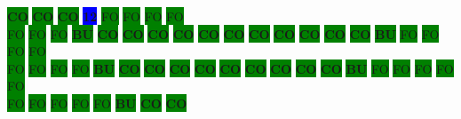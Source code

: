 \colorbox{green}{\color[rgb]{0,0,0}\textbf{CO}}%
\colorbox{green}{\color[rgb]{0,0,0}\textbf{CO}}%
\colorbox{green}{\color[rgb]{0,0,0}\textbf{CO}}%
\colorbox{blue}{\color[rgb]{1,0,0}\textbf{12}}%
\colorbox{green}{\color[gray]{0.75}FO}%
\colorbox{green}{\color[gray]{0.75}FO}%
\colorbox{green}{\color[gray]{0.75}FO}%
\colorbox{green}{\color[gray]{0.75}FO}%
\\
\colorbox{green}{\color[gray]{0.75}FO}%
\colorbox{green}{\color[gray]{0.75}FO}%
\colorbox{green}{\color[gray]{0.75}FO}%
\colorbox{green}{\color[rgb]{1,0,0}\textbf{BU}}%
\colorbox{green}{\color[rgb]{0,0,0}\textbf{CO}}%
\colorbox{green}{\color[rgb]{0,0,0}\textbf{CO}}%
\colorbox{green}{\color[rgb]{0,0,0}\textbf{CO}}%
\colorbox{green}{\color[rgb]{0,0,0}\textbf{CO}}%
\colorbox{green}{\color[rgb]{0,0,0}\textbf{CO}}%
\colorbox{green}{\color[rgb]{0,0,0}\textbf{CO}}%
\colorbox{green}{\color[rgb]{0,0,0}\textbf{CO}}%
\colorbox{green}{\color[rgb]{0,0,0}\textbf{CO}}%
\colorbox{green}{\color[rgb]{0,0,0}\textbf{CO}}%
\colorbox{green}{\color[rgb]{0,0,0}\textbf{CO}}%
\colorbox{green}{\color[rgb]{0,0,0}\textbf{CO}}%
\colorbox{green}{\color[rgb]{1,0,0}\textbf{BU}}%
\colorbox{green}{\color[gray]{0.75}FO}%
\colorbox{green}{\color[gray]{0.75}FO}%
\colorbox{green}{\color[gray]{0.75}FO}%
\colorbox{green}{\color[gray]{0.75}FO}%
\\
\colorbox{green}{\color[gray]{0.75}FO}%
\colorbox{green}{\color[gray]{0.75}FO}%
\colorbox{green}{\color[gray]{0.75}FO}%
\colorbox{green}{\color[gray]{0.75}FO}%
\colorbox{green}{\color[rgb]{1,0,0}\textbf{BU}}%
\colorbox{green}{\color[rgb]{0,0,0}\textbf{CO}}%
\colorbox{green}{\color[rgb]{0,0,0}\textbf{CO}}%
\colorbox{green}{\color[rgb]{0,0,0}\textbf{CO}}%
\colorbox{green}{\color[rgb]{0,0,0}\textbf{CO}}%
\colorbox{green}{\color[rgb]{0,0,0}\textbf{CO}}%
\colorbox{green}{\color[rgb]{0,0,0}\textbf{CO}}%
\colorbox{green}{\color[rgb]{0,0,0}\textbf{CO}}%
\colorbox{green}{\color[rgb]{0,0,0}\textbf{CO}}%
\colorbox{green}{\color[rgb]{0,0,0}\textbf{CO}}%
\colorbox{green}{\color[rgb]{1,0,0}\textbf{BU}}%
\colorbox{green}{\color[gray]{0.75}FO}%
\colorbox{green}{\color[gray]{0.75}FO}%
\colorbox{green}{\color[gray]{0.75}FO}%
\colorbox{green}{\color[gray]{0.75}FO}%
\colorbox{green}{\color[gray]{0.75}FO}%
\\
\colorbox{green}{\color[gray]{0.75}FO}%
\colorbox{green}{\color[gray]{0.75}FO}%
\colorbox{green}{\color[gray]{0.75}FO}%
\colorbox{green}{\color[gray]{0.75}FO}%
\colorbox{green}{\color[gray]{0.75}FO}%
\colorbox{green}{\color[rgb]{1,0,0}\textbf{BU}}%
\colorbox{green}{\color[rgb]{0,0,0}\textbf{CO}}%
\colorbox{green}{\color[rgb]{0,0,0}\textbf{CO}}%
